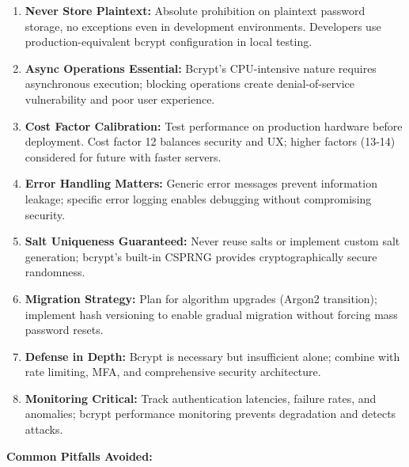\documentclass[12pt,a4paper]{article}
\begin{document}
\begin{enumerate}[leftmargin=2em, itemsep=6pt]
    \item \textbf{Never Store Plaintext:} Absolute prohibition on plaintext password storage, no exceptions even in development environments. Developers use production-equivalent bcrypt configuration in local testing.
    
    \item \textbf{Async Operations Essential:} Bcrypt's CPU-intensive nature requires asynchronous execution; blocking operations create denial-of-service vulnerability and poor user experience.
    
    \item \textbf{Cost Factor Calibration:} Test performance on production hardware before deployment. Cost factor 12 balances security and UX; higher factors (13-14) considered for future with faster servers.
    
    \item \textbf{Error Handling Matters:} Generic error messages prevent information leakage; specific error logging enables debugging without compromising security.
    
    \item \textbf{Salt Uniqueness Guaranteed:} Never reuse salts or implement custom salt generation; bcrypt's built-in CSPRNG provides cryptographically secure randomness.
    
    \item \textbf{Migration Strategy:} Plan for algorithm upgrades (Argon2 transition); implement hash versioning to enable gradual migration without forcing mass password resets.
    
    \item \textbf{Defense in Depth:} Bcrypt is necessary but insufficient alone; combine with rate limiting, MFA, and comprehensive security architecture.
    
    \item \textbf{Monitoring Critical:} Track authentication latencies, failure rates, and anomalies; bcrypt performance monitoring prevents degradation and detects attacks.
\end{enumerate}

\vspace{0.5em}

\textbf{Common Pitfalls Avoided:}
\end{document}
